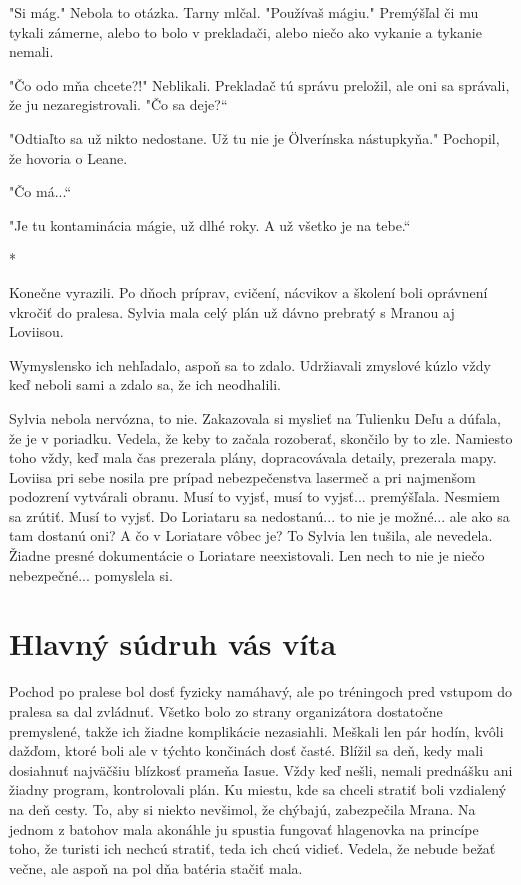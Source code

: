 \documentclass{book}
\begin{document}
"$ $Si mág."$ $ Nebola to otázka. Tarny mlčal. "$ $Používaš mágiu."$ $ Premýšľal či mu tykali zámerne, alebo to bolo v prekladači, alebo niečo ako vykanie a tykanie nemali.

"$ $Čo odo mňa chcete?!"$ $ Neblikali. Prekladač tú správu preložil, ale oni sa správali, že ju nezaregistrovali. "$ $Čo sa deje?“

"$ $Odtiaľto sa už nikto nedostane. Už tu nie je Ölverínska nástupkyňa."$ $ Pochopil, že hovoria o Leane.

"$ $Čo má...“

"$ $Je tu kontaminácia mágie, už dlhé roky. A už všetko je na tebe.“

\begin{center}

*

\end{center}

Konečne vyrazili. Po dňoch príprav, cvičení, nácvikov a školení boli oprávnení vkročiť do pralesa. Sylvia mala celý plán už dávno prebratý s Mranou aj Loviisou.

Wymyslensko ich nehľadalo, aspoň sa to zdalo. Udržiavali zmyslové kúzlo vždy keď neboli sami a zdalo sa, že ich neodhalili.

Sylvia nebola nervózna, to nie. Zakazovala si myslieť na Tulienku Deľu a dúfala, že je v poriadku. Vedela, že keby to začala rozoberať, skončilo by to zle. Namiesto toho vždy, keď mala čas prezerala plány, dopracovávala detaily, prezerala mapy. Loviisa pri sebe nosila pre prípad nebezpečenstva lasermeč a pri najmenšom podozrení vytvárali obranu. Musí to vyjsť, musí to vyjsť... premýšľala. Nesmiem sa zrútiť. Musí to vyjsť. Do Loriataru sa nedostanú... to nie je možné... ale ako sa tam dostanú oni? A čo v Loriatare vôbec je? To Sylvia len tušila, ale nevedela. Žiadne presné dokumentácie o Loriatare neexistovali. Len nech to nie je niečo nebezpečné... pomyslela si.

\chapter{Hlavný súdruh vás víta}

Pochod po pralese bol dosť fyzicky namáhavý, ale po tréningoch pred vstupom do pralesa sa dal zvládnuť. Všetko bolo zo strany organizátora dostatočne premyslené, takže ich žiadne komplikácie nezasiahli. Meškali len pár hodín, kvôli dažďom, ktoré boli ale v týchto končinách dosť časté. Blížil sa deň, kedy mali dosiahnuť najväčšiu blízkosť prameňa Iasue. Vždy keď nešli, nemali prednášku ani žiadny program, kontrolovali plán. Ku miestu, kde sa chceli stratiť boli vzdialený na deň cesty. To, aby si niekto nevšimol, že chýbajú, zabezpečila Mrana. Na jednom z batohov mala akonáhle ju spustia fungovať hlagenovka na princípe toho, že turisti ich nechcú stratiť, teda ich chcú vidieť. Vedela, že nebude bežať večne, ale aspoň na pol dňa batéria stačiť mala.
\end{document}
